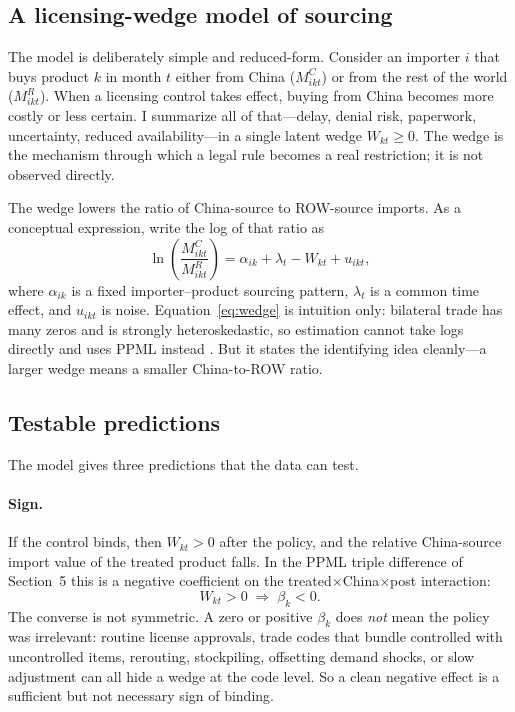 \documentclass[12pt,a4paper]{article}
\begin{document}
\subsection{A licensing-wedge model of sourcing}\label{sec:model}

The model is deliberately simple and reduced-form. Consider an importer $i$ that
buys product $k$ in month $t$ either from China ($M^{C}_{ikt}$) or from the rest
of the world ($M^{R}_{ikt}$). When a licensing control takes effect, buying from
China becomes more costly or less certain. I summarize all of that---delay, denial
risk, paperwork, uncertainty, reduced availability---in a single latent wedge
$W_{kt}\geq 0$. The wedge is the mechanism through which a legal rule becomes a
real restriction; it is not observed directly.

The wedge lowers the ratio of China-source to ROW-source imports. As a
conceptual expression, write the log of that ratio as
\begin{equation}
\ln\!\left(\frac{M^{C}_{ikt}}{M^{R}_{ikt}}\right)
= \alpha_{ik} + \lambda_{t} - W_{kt} + u_{ikt},
\label{eq:wedge}
\end{equation}
where $\alpha_{ik}$ is a fixed importer--product sourcing pattern, $\lambda_t$ is
a common time effect, and $u_{ikt}$ is noise. Equation~\eqref{eq:wedge} is
intuition only: bilateral trade has many zeros and is strongly heteroskedastic,
so estimation cannot take logs directly and uses PPML instead
\citep{santossilva2006gravity}. But it states the identifying idea cleanly---a
larger wedge means a smaller China-to-ROW ratio.

\subsection{Testable predictions}\label{sec:predictions}

The model gives three predictions that the data can test.

\paragraph{Sign.} If the control binds, then $W_{kt}>0$ after the policy, and the
relative China-source import value of the treated product falls. In the PPML triple difference of
Section~5 this is a negative coefficient on the
treated$\times$China$\times$post interaction:
\begin{equation}
W_{kt}>0 \;\Longrightarrow\; \beta_{k}<0.
\label{eq:sign}
\end{equation}
The converse is not symmetric. A zero or positive $\beta_k$ does \emph{not} mean
the policy was irrelevant: routine license approvals, trade codes that bundle
controlled with uncontrolled items, rerouting, stockpiling, offsetting demand
shocks, or slow adjustment can all hide a wedge at the code level. So a clean
negative effect is a sufficient but not necessary sign of binding.
\end{document}
